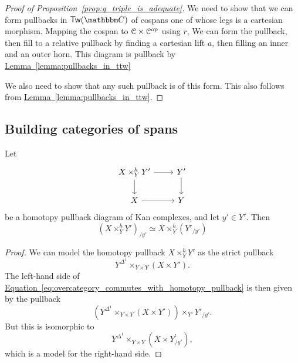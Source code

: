 \documentclass[main.tex]{subfiles}
\begin{document}
\begin{proof}[Proof of Proposition~\ref*{prop:q_triple_is_adequate}]
  We need to show that we can form pullbacks in $\Tw(\CC)$ of cospans one of whose legs is a cartesian morphism. Mapping the cospan to $\mathcal{C} \times \mathcal{C}^{\mathrm{op}}$ using $r$, We can form the pullback, then fill to a relative pullback by finding a cartesian lift $a$, then filling an inner and an outer horn. This diagram is pullback by \hyperref[lemma:pullbacks_in_ttw]{Lemma~\ref*{lemma:pullbacks_in_ttw}}

  We also need to show that any such pullback is of this form. This also follows from \hyperref[lemma:pullbacks_in_ttw]{Lemma~\ref*{lemma:pullbacks_in_ttw}}.
\end{proof}

\subsection{Building categories of spans}
\label{ssc:building_categories_of_spans_bare}

\begin{lemma}
  \label{lemma:homotopy_pullbacks_and_overcategories}
  Let
  \begin{equation*}
    \begin{tikzcd}
      X \times_{Y}^{h} Y'
      \arrow[r]
      \arrow[d]
      & Y'
      \arrow[d]
      \\
      X
      \arrow[r]
      & Y
    \end{tikzcd}
  \end{equation*}
  be a homotopy pullback diagram of Kan complexes, and let $y' \in Y'$. Then
  \begin{equation}
    \label{eq:overcategory_commutes_with_homotopy_pullback}
    (X \times_{Y}^{h}Y')_{/y'} \simeq X \times_{Y}^{h} (Y'_{/y'})
  \end{equation}
\end{lemma}
\begin{proof}
  We can model the homotopy pullback $X \times^{h}_{Y}Y'$ as the strict pullback
  \begin{equation*}
    Y^{\Delta^{1}} \times_{Y \times Y} (X \times Y').
  \end{equation*}
  The left-hand side of \hyperref[eq:overcategory_commutes_with_homotopy_pullback]{Equation~\ref*{eq:overcategory_commutes_with_homotopy_pullback}} is then given by the pullback
  \begin{equation*}
    \left(Y^{\Delta^{1}} \times_{Y \times Y}(X \times Y')\right) \times_{Y'} Y'_{/y'}.
  \end{equation*}
  But this is isomorphic to
  \begin{equation*}
    Y^{\Delta^{1}} \times_{Y \times Y} (X \times Y^{'}_{/y'}),
  \end{equation*}
  which is a model for the right-hand side.
\end{proof}
\end{document}

